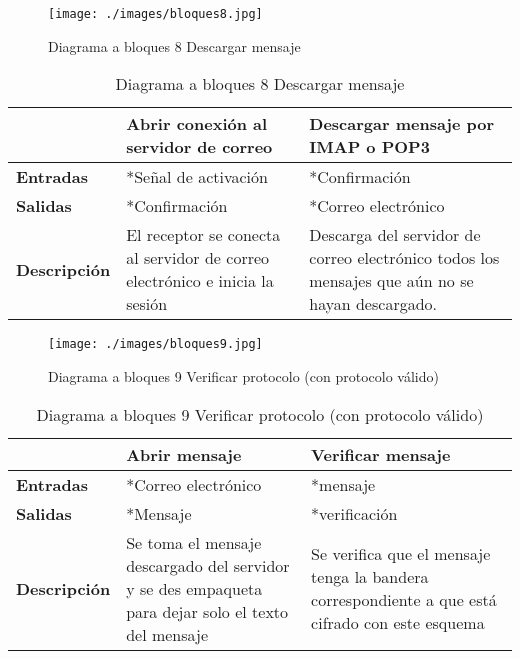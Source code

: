 \documentclass[12pt,oneside,onecolumn,openany]{report}
\begin{document}
\pagebreak
\begin{figure}[H]
	\texttt{[image: ./images/bloques8.jpg]}
	\caption{Diagrama a bloques 8 Descargar mensaje}
	\label{fig:5-8-1}
\end{figure}
\begin{table}[H]
 \centering
   {
     \begin{tabular}{| p{3cm} | p{4cm} | p{4cm} |}
     \hline
     & \textbf{Abrir conexión al servidor de correo} & \textbf{Descargar mensaje por IMAP o POP3}\\
     \hline
     \textbf{Entradas} & *Señal de activación & *Confirmación\\
     \hline
     \textbf{Salidas} & *Confirmación & *Correo electrónico\\
     \hline
     \textbf{Descripción} & El receptor se conecta al servidor de correo electrónico e inicia la sesión & Descarga del servidor de correo electrónico todos los mensajes que aún no se hayan descargado.\\

    \end{tabular}
    }
    \caption{Diagrama a bloques 8 Descargar mensaje}
    \label{tabla:b8}
\end{table}
\begin{figure}[H]
	\texttt{[image: ./images/bloques9.jpg]}
	\caption{Diagrama a bloques 9 Verificar protocolo (con protocolo válido)}
	\label{fig:5-9-1}
\end{figure}
\begin{table}[H]
 \centering
   {
     \begin{tabular}{| p{3cm} | p{4cm} | p{4cm} |}
     \hline
     & \textbf{Abrir mensaje} & \textbf{Verificar mensaje}\\
     \hline
     \textbf{Entradas} & *Correo electrónico & *mensaje\\
     \hline
     \textbf{Salidas} & *Mensaje & *verificación\\
     \hline
     \textbf{Descripción} & Se toma el mensaje descargado del servidor y se des empaqueta para dejar solo el texto del mensaje & Se verifica que el mensaje tenga la bandera correspondiente a que está cifrado con este esquema\\

    \end{tabular}
    }
    \caption{Diagrama a bloques 9 Verificar protocolo (con protocolo válido)}
    \label{tabla:b9}
\end{table}
\end{document}
